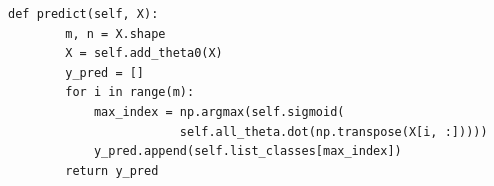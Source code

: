 \documentclass[letterpaper,10pt]{article}
\theoremstyle{mytheor}
\begin{document}
\begin{lstlisting}[label={list:fifth},caption=Prediction Process]
    def predict(self, X):
        m, n = X.shape
        X = self.add_theta0(X)
        y_pred = []
        for i in range(m):
            max_index = np.argmax(self.sigmoid(
            			self.all_theta.dot(np.transpose(X[i, :]))))
            y_pred.append(self.list_classes[max_index])
        return y_pred
\end{lstlisting}
\end{document}
